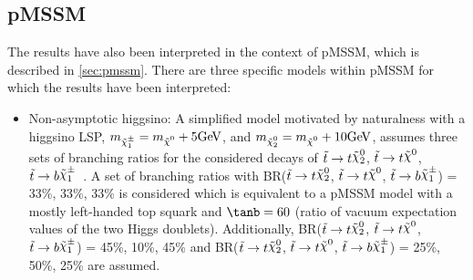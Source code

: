 

\subsection{pMSSM}
The results have also been interpreted in the context of pMSSM, which is described in \ref{sec:pmssm}.  There are three specific models within pMSSM for which the results have been interpreted:

\begin{itemize}
	\item Non-asymptotic higgsino: A simplified model motivated by naturalness with a higgsino LSP, ${m_{\chinoonepm}=\mLSP+5\gev}$, and ${m_{\ninotwo}=\mLSP+10\gev}$, assumes three sets of branching ratios for the considered decays of $\stop\to t\ninotwo$, $\stop\to t\LSP$, $\stop\to b\chinoonepm$~\cite{naturalSUSY}. A set of branching ratios with BR($\stop\to t\ninotwo$, $\stop\to t\LSP$, $\stop\to b\chinoonepm$) = 33\%, 33\%, 33\% is considered which is equivalent to a pMSSM model with a mostly left-handed top squark and $\tanb=60$ (ratio of vacuum expectation values of the two Higgs doublets). Additionally, BR($\stop\to t\ninotwo$, $\stop\to t\LSP$, $\stop\to b\chinoonepm$) = 45\%, 10\%, 45\% and BR($\stop\to t\ninotwo$, $\stop\to t\LSP$, $\stop\to b\chinoonepm$) = 25\%, 50\%, 25\% are assumed.%


\end{itemize}
